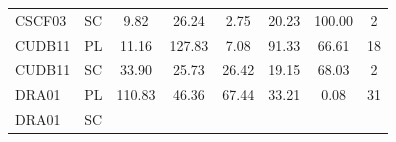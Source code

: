 \documentclass[11pt,a4paper]{article}
\begin{document}
\begin{table}[H]
\begin{tabular}{llcccccc}
    \\

    CSCF03 &
    SC &

    
        9.82
     &

    
        26.24
     &

    
        2.75
     &

    
        20.23
     &

    
        100.00
     &

    
        2
    
    \\

    CUDB11 &
    PL &

    
        11.16
     &

    
        127.83
     &

    
        7.08
     &

    
        91.33
     &

    
        66.61
     &

    
        18
    
    \\

    CUDB11 &
    SC &

    
        33.90
     &

    
        25.73
     &

    
        26.42
     &

    
        19.15
     &

    
        68.03
     &

    
        2
    
    \\

    DRA01 &
    PL &

    
        110.83
     &

    
        46.36
     &

    
        67.44
     &

    
        33.21
     &

    
        0.08
     &

    
        31
    
    \\

    DRA01 &
    SC &


\end{tabular}
\end{table}
\end{document}
